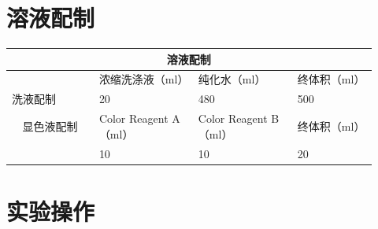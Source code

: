 \documentclass[UTF8,10pt,a4paper,fontset=fandol]{ctexart}
\newcommand{\fieldvalue}[1]{#1}
\newcommand{\handwritten}[1]{#1}
\begin{document}
\section*{溶液配制}

\begin{center}
\small
\begin{tabular}{|p{0.22\linewidth}|p{0.25\linewidth}|p{0.25\linewidth}|p{0.20\linewidth}|}
\hline
\multicolumn{4}{|c|}{溶液配制}\\
\hline
 & 浓缩洗涤液（ml） & 纯化水（ml） & 终体积（ml）\\
\hline
洗液配制 &
\fieldvalue{\handwritten{20}} &
\fieldvalue{\handwritten{480}} &
\fieldvalue{\handwritten{500}}\\
\hline
\multicolumn{1}{|c|}{显色液配制} &
Color Reagent A（ml） & Color Reagent B（ml） & 终体积（ml）\\
\hline
 &
\fieldvalue{\handwritten{10}} &
\fieldvalue{\handwritten{10}} &
\fieldvalue{\handwritten{20}}\\
\hline
\end{tabular}
\end{center}

\section*{实验操作}
\end{document}

